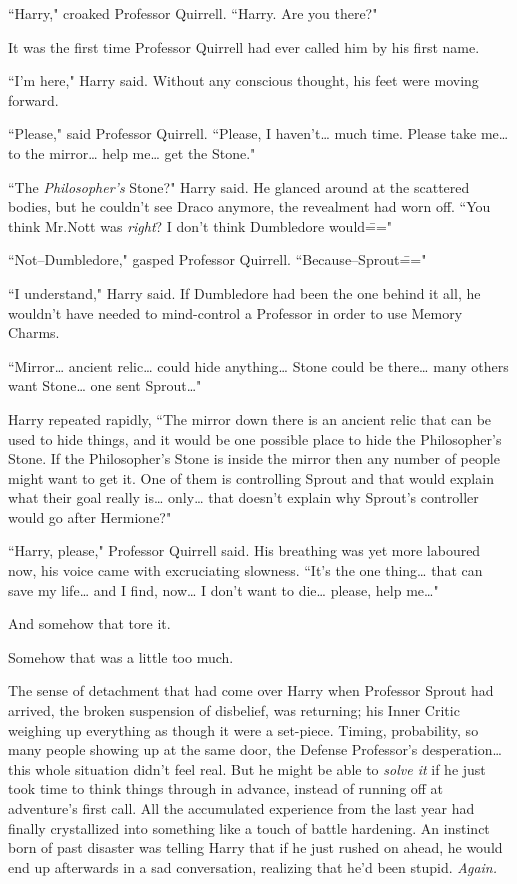 ``Harry," croaked Professor Quirrell. ``Harry. Are you there?"

It was the first time Professor Quirrell had ever called him by his first name.

``I'm here," Harry said. Without any conscious thought, his feet were moving forward.

``Please," said Professor Quirrell. ``Please, I haven't{\ldots} much time. Please take me{\ldots} to the mirror{\ldots} help me{\ldots} get the Stone."

``The \emph{Philosopher's} Stone?" Harry said. He glanced around at the scattered bodies, but he couldn't see Draco anymore, the revealment had worn off. ``You think Mr.\?Nott was \emph{right}? I don't think Dumbledore would\==="

``Not\---Dumbledore," gasped Professor Quirrell. ``Because\---Sprout\==="

``I understand," Harry said. If Dumbledore had been the one behind it all, he wouldn't have needed to mind-control a Professor in order to use Memory Charms.

``Mirror{\ldots} ancient relic{\ldots} could hide anything{\ldots} Stone could be there{\ldots} many others want Stone{\ldots} one sent Sprout{\ldots}"

Harry repeated rapidly, ``The mirror down there is an ancient relic that can be used to hide things, and it would be one possible place to hide the Philosopher's Stone. If the Philosopher's Stone is inside the mirror then any number of people might want to get it. One of them is controlling Sprout and that would explain what their goal really is{\ldots} only{\ldots} that doesn't explain why Sprout's controller would go after Hermione?"

``Harry, please," Professor Quirrell said. His breathing was yet more laboured now, his voice came with excruciating slowness. ``It's the one thing{\ldots} that can save my life{\ldots} and I find, now{\ldots} I don't want to die{\ldots} please, help me{\ldots}"

And somehow that tore it.

Somehow that was a little too much.

The sense of detachment that had come over Harry when Professor Sprout had arrived, the broken suspension of disbelief, was returning; his Inner Critic weighing up everything as though it were a set-piece. Timing, probability, so many people showing up at the same door, the Defense Professor's desperation{\ldots} this whole situation didn't feel real. But he might be able to \emph{solve it} if he just took time to think things through in advance, instead of running off at adventure's first call. All the accumulated experience from the last year had finally crystallized into something like a touch of battle hardening. An instinct born of past disaster was telling Harry that if he just rushed on ahead, he would end up afterwards in a sad conversation, realizing that he'd been stupid. \emph{Again.}

